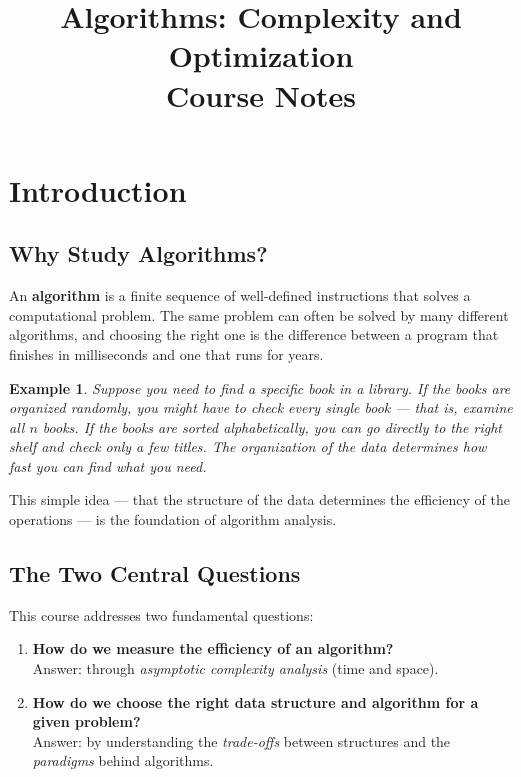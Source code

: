 \documentclass[11pt,a4paper]{article}
\title{\textbf{Algorithms: Complexity and Optimization}\\
\large Course Notes}
\author{}
\date{}
\newtheorem{example}[theorem]{Example}
\begin{document}
\maketitle

\tableofcontents
\newpage

\section{Introduction}

\subsection{Why Study Algorithms?}

An \textbf{algorithm} is a finite sequence of well-defined instructions that solves a computational problem. The same problem can often be solved by many different algorithms, and choosing the right one is the difference between a program that finishes in milliseconds and one that runs for years.

\begin{example}
Suppose you need to find a specific book in a library. If the books are organized randomly, you might have to check every single book --- that is, examine all $n$ books. If the books are sorted alphabetically, you can go directly to the right shelf and check only a few titles. The \emph{organization} of the data determines how fast you can find what you need.
\end{example}

This simple idea --- that the structure of the data determines the efficiency of the operations --- is the foundation of algorithm analysis.

\subsection{The Two Central Questions}

This course addresses two fundamental questions:

\begin{enumerate}
    \item \textbf{How do we measure the efficiency of an algorithm?}\\
    Answer: through \emph{asymptotic complexity analysis} (time and space).
    
    \item \textbf{How do we choose the right data structure and algorithm for a given problem?}\\
    Answer: by understanding the \emph{trade-offs} between structures and the \emph{paradigms} behind algorithms.
\end{enumerate}
\end{document}
